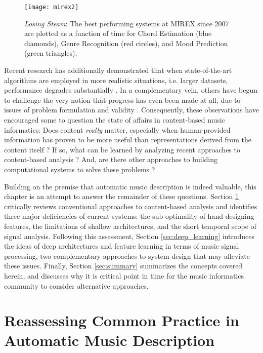 \begin{figure}
\begin{centering}
\texttt{[image: mirex2]}
\caption{\emph{Losing Steam}: The best performing systems at MIREX since 2007 are plotted as a function of time for Chord Estimation (blue diamonds), Genre Recognition (red circles), and Mood Prediction (green triangles).}
\label{fig:mirex}
\end{centering}
\end{figure}

Recent research has additionally demonstrated that when state-of-the-art algorithms are employed in more realistic situations, i.e. larger datasets, performance degrades substantially \cite{BertinMahieux2012}.
In a complementary vein, others have begun to challenge the very notion that progress has even been made at all, due to issues of problem formulation and validity \cite{Sturm2013}.
Consequently, these observations have encouraged some to question the state of affairs in content-based music informatics:
Does content \emph{really} matter, especially when human-provided information has proven to be more useful than representations derived from the content itself \cite{Slaney2011}?
If so, what can be learned by analyzing recent approaches to content-based analysis \cite{Flexer2012}?
And, are there other approaches to building computational systems to solve these problems \cite{Humphrey2012a}?

Building on the premise that automatic music description is indeed valuable, this chapter is an attempt to answer the remainder of these questions.
Section \ref{sec:common} critically reviews conventional approaches to content-based analysis and identifies three major deficiencies of current systems: the sub-optimality of hand-designing features, the limitations of shallow architectures, and the short temporal scope of signal analysis.
Following this assessment, Section \ref{sec:deep_learning} introduces the ideas of deep architectures and feature learning in terms of music signal processing, two complementary approaches to system design that may alleviate these issues.
Finally, Section \ref{sec:summary} summarizes the concepts covered herein, and discusses why it is critical point in time for the music informatics community to consider alternative approaches.


\section{Reassessing Common Practice in Automatic Music Description}
\label{sec:common}

